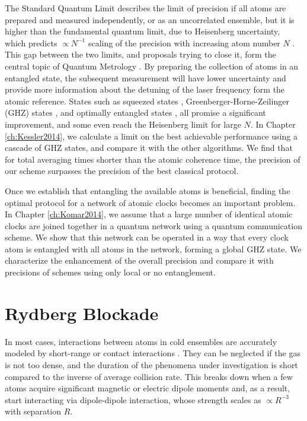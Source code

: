 The Standard Quantum Limit describes the limit of precision if all atoms are
prepared and measured independently, or as an uncorrelated ensemble, but it is
higher than the fundamental quantum limit, due to Heisenberg uncertainty, which
predicts $\propto N^{-1}$ scaling of the precision with increasing atom number
$N$ \cite{Hall2012}. This gap between the two limits, and proposals trying to
close it, form the central topic of Quantum Metrology \cite{Giovanetti2011, Escher:2011fn}. By
preparing the collection of atoms in an entangled state, the subsequent
measurement will have lower uncertainty and provide more information about the
detuning of the laser frequency form the atomic reference. States such as
squeezed states \cite{Andre2004, Borregaard2013_nearHeisenberg},
Greenberger-Horne-Zeilinger (GHZ) states \cite{Wineland1998, Bollinger1996}, and
optimally entangled states \cite{Buzek1999, Berry2009}, all promise a
significant improvement, and some even reach the
Heisenberg limit for large $N$. In Chapter \ref{ch:Kessler2014}, we calculate
a limit on the best achievable performance using a cascade of GHZ states, and
compare it with the other algorithms. We find that for total averaging
times shorter than the atomic coherence time, the precision of our scheme
surpasses the precision of the best classical protocol.

Once we establish that entangling the available atoms is beneficial, finding the
optimal protocol for a network of atomic clocks becomes an important problem. In
Chapter \ref{ch:Komar2014}, we assume that a large number of identical atomic
clocks are joined together in a quantum network using a quantum communication
scheme. We show that this network can be operated in a way that every clock
atom is entangled with all atoms in the network, forming a global
GHZ state. We characterize the enhancement of the overall precision and compare
it with precisions of schemes using only local or no entanglement.





\section{Rydberg Blockade}
In most cases, interactions between atoms in cold ensembles are accurately
modeled by short-range or contact interactions \cite{Cheng2010}.
They can be neglected if the gas is not too dense, and the duration of the
phenomena under investigation is short compared to the inverse of average
collision rate. This breaks down when a few atoms acquire significant magnetic
or electric dipole moments and, as a result, start interacting via dipole-dipole
interaction, whose strength scales as $\propto R^{-3}$ with separation $R$.

